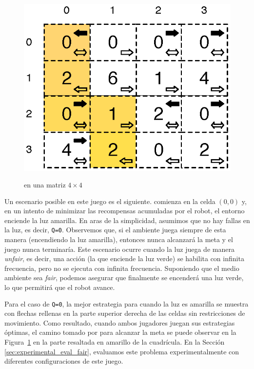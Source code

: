 \begin{figure}
\centering
{\fontsize{6.6}{6.6}\selectfont\ttfamily
\includegraphics[scale=0.65]{Figs/robotMovesRewards.eps}\hspace{1em}\mbox{}}
\caption{\roborta en una matriz $4 \times 4$} \label{fig:robot_game_grid}
\end{figure}

Un escenario posible en este juego es el siguiente. \roborta comienza en la celda $(0,0)$ y, en un intento de minimizar las recompensas acumuladas por el robot, el entorno enciende la luz amarilla.
En aras de la simplicidad, asumimos que no hay fallas en la luz, es decir, \texttt{Q=0}.
Observemos que, si el ambiente juega siempre de esta manera (encendiendo la luz amarilla), entonces \roborta nunca alcanzará la meta y
el juego nunca terminaría. Este escenario ocurre cuando la luz juega de manera \textit{unfair}, es decir, una acción (la que enciende la luz verde) se habilita con infinita frecuencia, pero no se ejecuta con infinita frecuencia.
Suponiendo que el medio ambiente sea \textit{fair}, podemos asegurar que finalmente se encenderá una luz verde, lo que permitirá que el robot avance.

Para el caso de \texttt{Q=0}, la mejor estrategia para \roborta cuando la luz es amarilla se muestra con flechas rellenas en la parte superior derecha de las celdas sin restricciones de movimiento.
Como resultado, cuando ambos jugadores juegan sus estrategias óptimas, el camino tomado por \roborta para alcanzar la meta se puede observar en la Figura~\ref{fig:robot_game_grid} en la parte resaltada en amarillo de la cuadrícula. En la Sección \ref{sec:experimental_eval_fair}, evaluamos este problema experimentalmente con diferentes
configuraciones de este juego.